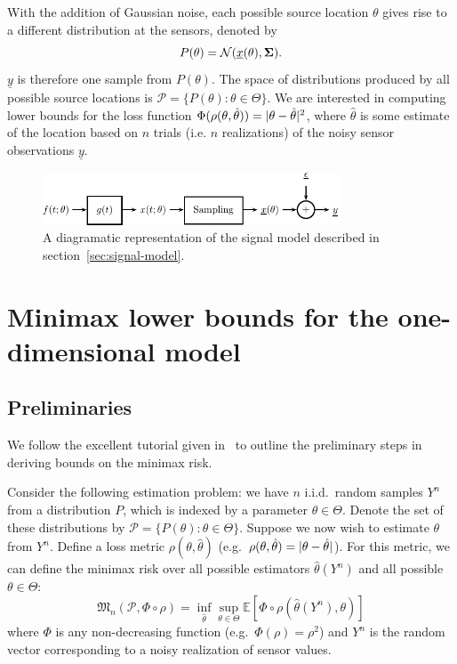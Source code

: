 \documentclass[conference]{IEEEtran}
\providecommand{\v}{}
\renewcommand{\v}[1]{\underline{#1}}
\providecommand{\m}{}
\renewcommand{\m}[1]{{\bf #1}}
\DeclarePairedDelimiter\abs{\lvert}{\rvert}
\newcommand{\Phiorho}{\Phi\!\circ\!\rho}
\begin{document}
With the addition of Gaussian noise, each possible source location $\theta$
gives rise to a different distribution at the sensors, denoted by
\begin{equation} \label{eq:p-theta}
	P(\theta) = \mathcal{N}(\v x(\theta), \m \Sigma).
\end{equation}
$\v y$ is therefore one sample from $P(\theta)$. The space of distributions
produced by all possible source locations is $\mathcal{P} = \{P(\theta) :
\theta \in \Theta \}$. We are interested in computing lower bounds for the loss
function $\Phi(\rho(\theta, \hat\theta)) = \abs{\theta - \hat\theta}^2$, where
$\hat\theta$ is some estimate of the location based on $n$ trials (i.e. $n$
realizations) of the noisy sensor observations $\v y$.

\begin{figure}[tp] %
	\centering
	\includegraphics[width=3.5in]{block-diagram}
	\caption{A diagramatic representation of the signal model described in
	section~\ref{sec:signal-model}.}
	\label{fig:signal-model}
\end{figure}

\section{Minimax lower bounds for the one-dimensional model}
\label{sec:minimax-lower-bounds}

\subsection{Preliminaries}

We follow the excellent tutorial given in~\cite{Duchi2015Information} to
outline the preliminary steps in deriving bounds on the minimax risk.

Consider the following estimation problem: we have $n$ i.i.d.\ random samples
$Y^n$ from a distribution $P$, which is indexed by a parameter $\theta \in
\Theta$.  Denote the set of these distributions by $\mathcal{P} = \{P(\theta) :
\theta \in \Theta\}$. Suppose we now wish to estimate $\theta$ from $Y^n$.
Define a loss metric $\rho(\theta, \hat\theta)$ (e.g.\ $\rho(\theta,
\hat\theta) = \abs{\theta - \hat\theta}$). For this metric, we can define the
minimax risk over all possible estimators $\hat\theta(Y^n)$ and all possible
$\theta \in \Theta$:
\begin{equation} \label{eq:minimax-expr}
	\mathfrak{M}_n(\mathcal{P}, \Phiorho) = \inf_{\hat\theta} \sup_{\theta \in \Theta} \mathbb E[\Phiorho (\hat\theta(Y^n), \theta)]
\end{equation}
where $\Phi$ is any non-decreasing function (e.g.\ $\Phi(\rho) = \rho^2$) and
$Y^n$ is the random vector corresponding to a noisy realization of sensor
values.
\end{document}
